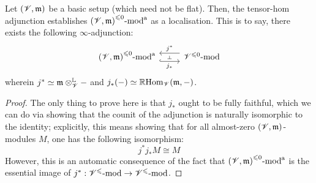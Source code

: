                     \begin{proposition} \label{prop: localising_at_almost_modules}
                        Let $(\mathscr{V}, \mathfrak{m})$ be a basic setup (which need not be flat). Then, the tensor-hom adjunction establishes ${(\mathscr{V}, \mathfrak{m})}^{\leqslant 0}\text{-}\mathrm{mod}^{\mathrm{a}}$ as a localisation. This is to say, there exists the following $\infty$-adjunction:
                            $$
                                \begin{tikzcd}
                                	{{(\scrV, \m)}^{\leq 0}\mod^{\almost}} & {{\scrV}^{\leq 0}\mod}
                                	\arrow[""{name=0, anchor=center, inner sep=0}, "{j_*}"', shift right=2, hook, from=1-1, to=1-2]
                                	\arrow[""{name=1, anchor=center, inner sep=0}, "{j^*}"', shift right=2, from=1-2, to=1-1]
                                	\arrow["\dashv"{anchor=center, rotate=-90}, draw=none, from=1, to=0]
                                \end{tikzcd}
                            $$
                        wherein $j^* \cong \m \tensor_{\scrV}^{\L} -$ and $j_*(-) \simeq \mathbb{R}\mathrm{Hom}_{\mathscr{V}}(\mathfrak{m}, -)$.
                    \end{proposition}
                        \begin{proof}
                            The only thing to prove here is that $j_*$ ought to be fully faithful, which we can do via showing that the counit of the adjunction is naturally isomorphic to the identity; explicitly, this means showing that for all almost-zero $(\mathscr{V}, \mathfrak{m})$-modules $M$, one has the following isomorphism:
                                $$j^* j_* M \cong M$$
                            However, this is an automatic consequence of the fact that ${(\mathscr{V}, \mathfrak{m})}^{\leqslant 0}\text{-}\mathrm{mod}^{\mathrm{a}}$ is the essential image of $j^*: {\mathscr{V}}^{\leqslant}\text{-}\mathrm{mod} \to {\mathscr{V}}^{\leqslant}\text{-}\mathrm{mod}$.
                        \end{proof}
                    
